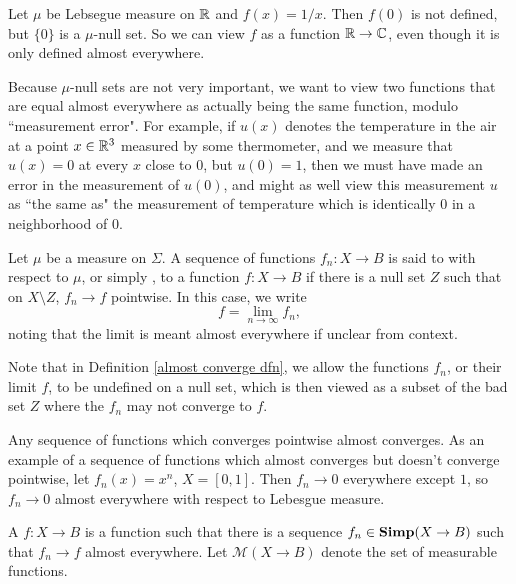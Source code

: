 \begin{example}
Let $\mu$ be Lebsegue measure on $\mathbb{R}$ and $f(x) = 1/x$.
Then $f(0)$ is not defined, but $\{0\}$ is a $\mu$-null set.
So we can view $f$ as a function $\mathbb{R} \to \mathbb{C}$, even though it is only defined almost everywhere.
\end{example}

\begin{subsec}
Because $\mu$-null sets are not very important, we want to view two functions that are equal almost everywhere as actually being the same function, modulo ``measurement error".
For example, if $u(x)$ denotes the temperature in the air at a point $x \in \mathbb{R}^3$ measured by some thermometer, and we measure that $u(x) = 0$ at every $x$ close to $0$, but $u(0) = 1$, then we must have made an error in the measurement of $u(0)$, and might as well view this measurement $u$ as ``the same as" the measurement of temperature which is identically $0$ in a neighborhood of $0$.
\end{subsec}

\begin{definition}
\label{almost converge dfn}
Let $\mu$ be a measure on $\Sigma$. A sequence of functions $f_{n}: X \to B$ is said to  with respect to $\mu$, or simply , to a function $f: X \to B$ if there is a null set $Z$ such that on $X \setminus Z$, $f_{n} \to f$ pointwise. In this case, we write
\[f = \lim_{n \to \infty} f_{n},\]
noting that the limit is meant almost everywhere if unclear from context.
\end{definition}

\begin{subsec}
Note that in Definition \ref{almost converge dfn}, we allow the functions $f_{n}$, or their limit $f$, to be undefined on a null set, which is then viewed as a subset of the bad set $Z$ where the $f_{n}$ may not converge to $f$.
\end{subsec}

\begin{example}
Any sequence of functions which converges pointwise almost converges.
As an example of a sequence of functions which almost converges but doesn't converge pointwise, let $f_{n}(x) = x^n$, $X = [0, 1]$. Then $f_{n} \to 0$ everywhere except $1$, so $f_{n} \to 0$ almost everywhere with respect to Lebesgue measure.
\end{example}

\begin{definition}
A  $f: X \to B$ is a function such that there is a sequence $f_{n} \in \mathbf{Simp}(X \to B)$ such that $f_{n} \to f$ almost everywhere.
Let $\mathcal M(X \to B)$ denote the set of measurable functions.
\end{definition}

